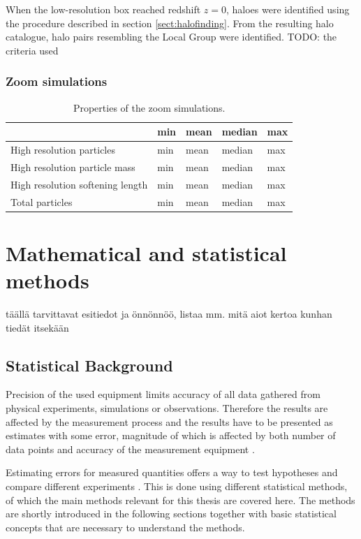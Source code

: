\documentclass[english, oneside]{HYgradu}
\begin{document}
When the low-resolution box reached redshift $z=0$, haloes were identified using the procedure described in section \ref{sect:halofinding}. From the resulting halo catalogue, halo pairs resembling the Local Group were identified. TODO: the criteria used %

\subsection{Zoom simulations}


\begin{table}
	\centering
	\begin{tabular}{| l | l | l | l | l |}
		\hline
		& min & mean & median & max \\ \hline
		High resolution particles & min & mean & median & max \\ \hline
		High resolution particle mass  & min & mean & median & max \\ \hline
		High resolution softening length & min & mean & median & max \\ \hline
		Total particles  & min & mean & median & max \\ \hline
	\end{tabular}
	\caption{Properties of the zoom simulations.} \label{tab:parentBox}
\end{table}


\chapter{Mathematical and statistical methods}
täällä tarvittavat esitiedot ja önnönnöö, listaa mm. mitä aiot kertoa kunhan tiedät itsekään

\section{Statistical Background}
\reversemarginpar
{}
Precision of the used equipment limits accuracy of all data gathered from physical experiments, simulations or observations. Therefore the results are affected by the measurement process and the results have to be presented as estimates with some error, magnitude of which is affected by both number of data points and accuracy of the measurement equipment \citep{bohm2010introduction}.

Estimating errors for measured quantities offers a way to test hypotheses and compare different experiments \citep{bohm2010introduction}. This is done using different statistical methods, of which the main methods relevant for this thesis are covered here. The methods are shortly introduced in the following sections together with basic statistical concepts that are necessary to understand the methods. 
\end{document}

